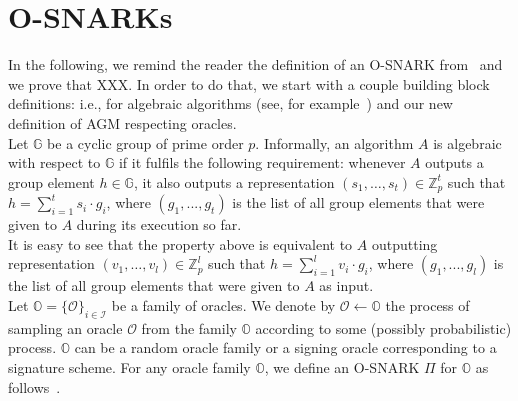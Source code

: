\section{O-SNARKs}
\label{sec:short_snarks_defs}
In the following, we remind the reader the definition of an O-SNARK from~\cite{O_SNARK} and we prove that {\color{red}XXX}.
In order to do that, we start with a couple building block definitions: i.e., for algebraic algorithms (see, for example~\cite{AGM_model}) 
and our new definition of AGM respecting oracles. \\

\noindent Let $\mathbb{G}$ be a cyclic group of prime order $p$. Informally, an algorithm $A$ is algebraic with respect to $\mathbb{G}$ if it fulfils the following requirement: 
whenever $A$ outputs a group element $h \in \mathbb{G}$, it also outputs a representation $(s_1, \ldots, s_t) \in \mathbb{Z}^{t}_p$ 
such that $h = \sum_ {i =1}^t s_i \cdot g_i$, where $(g_1,...,g_t)$ is the list of all group elements that were given to $A$ during its execution so far. \\

\noindent It is easy to see that the property above is equivalent to $A$ outputting  representation $(v_1, \ldots, v_l) \in \mathbb{Z}^{l}_p$ 
such that $h = \sum_ {i =1}^l v_i \cdot g_i$, where $(g_1,...,g_l)$ is the list of all group elements that were given to $A$ as input. \\


\noindent Let $\mathbb{O} = \{ \mathcal{O} \}_{i \in \mathcal{I}}$ be a family of oracles. We denote by $\mathcal{O} \leftarrow \mathbb{O}$ 
the process of sampling an oracle $\mathcal{O}$ from the family $\mathbb{O}$ according to some (possibly probabilistic) process.
$\mathbb{O}$ can be a random oracle family or a signing oracle corresponding to a signature scheme. For any oracle family 
$\mathbb{O}$, we define an O-SNARK $\Pi$ for $\mathbb{O}$ as follows~\cite{O_SNARK}. \\


